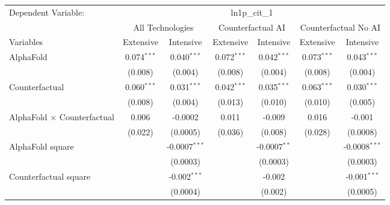 \begingroup
\centering
\begin{tabular}{lcccccc}
   \tabularnewline \midrule \midrule
   Dependent Variable: & \multicolumn{6}{c}{ln1p\_cit\_1}\\
 & \multicolumn{2}{c}{All Technologies} & \multicolumn{2}{c}{Counterfactual AI} & \multicolumn{2}{c}{Counterfactual No AI} \\
\cmidrule(lr){1-1}\cmidrule(lr){2-3} \cmidrule(lr){4-5} \cmidrule(lr){6-7}
Variables & \multicolumn{1}{c}{Extensive} & \multicolumn{1}{c}{Intensive} & \multicolumn{1}{c}{Extensive} & \multicolumn{1}{c}{Intensive} & \multicolumn{1}{c}{Extensive} & \multicolumn{1}{c}{Intensive} \\
\cmidrule(lr){1-1}\cmidrule(lr){2-2} \cmidrule(lr){3-3} \cmidrule(lr){4-4} \cmidrule(lr){5-5} \cmidrule(lr){6-6} \cmidrule(lr){7-7}
   AlphaFold                          & 0.074$^{***}$ & 0.040$^{***}$     & 0.072$^{***}$ & 0.042$^{***}$  & 0.073$^{***}$ & 0.043$^{***}$\\   
                                      & (0.008)       & (0.004)           & (0.008)       & (0.004)        & (0.008)       & (0.004)\\   
   Counterfactual                     & 0.060$^{***}$ & 0.031$^{***}$     & 0.042$^{***}$ & 0.035$^{***}$  & 0.063$^{***}$ & 0.030$^{***}$\\   
                                      & (0.008)       & (0.004)           & (0.013)       & (0.010)        & (0.010)       & (0.005)\\   
   AlphaFold $\times$ Counterfactual  & 0.006         & -0.0002           & 0.011         & -0.009         & 0.016         & -0.001\\   
                                      & (0.022)       & (0.0005)          & (0.036)       & (0.008)        & (0.028)       & (0.0008)\\   
   AlphaFold square                   &               & -0.0007$^{***}$   &               & -0.0007$^{**}$ &               & -0.0008$^{***}$\\   
                                      &               & (0.0003)          &               & (0.0003)       &               & (0.0003)\\   
   Counterfactual square              &               & -0.002$^{***}$    &               & -0.002         &               & -0.001$^{***}$\\   
                                      &               & (0.0004)          &               & (0.002)        &               & (0.0005)\\   

\end{tabular}
